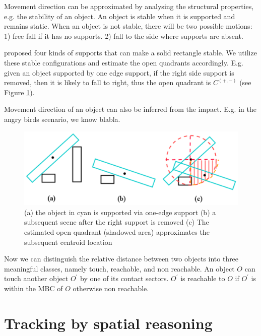\documentclass[letterpaper]{article}
\begin{document}
Movement direction can be approximated by analysing the structural properties, e.g. the stability of an object. An object is stable when it is supported and remains static. When an object is not stable, there will be two possible motions: 1) free fall if it has no supports. 2) fall to the side where supports are absent. 

\cite{Ge2013} proposed four kinds of supports that can make a solid rectangle stable. We utilize these stable configurations and estimate the open quadrants accordingly. E.g. given an object supported by one edge support, if the right side support is removed, then it is likely to fall to right, thus the open quadrant is $C^{(+,-)}$
(see Figure \ref{QudrantsEstimation}). 

Movement direction of an object can also be inferred from the impact. E.g. in the angry birds scenario, we know blabla.  

\begin{figure}[h!]\label{QudrantsEstimation}
\centering\includegraphics[scale=0.4]{QudrantsEstimation.png}\caption{(a) the object in cyan is supported via one-edge support  (b) a subsequent scene after the right support is removed (c) The estimated open quadrant (shadowed area) approximates the subsequent centroid location}
\end{figure}

Now we can distinguish the relative distance between two objects into three meaningful classes, namely touch, reachable, and non reachable. An object $O$ can touch another object $O^\prime$ by one of its contact sectors. $O^\prime$ is reachable to $O$ if $O^\prime$ is within the MBC of $O$ otherwise non reachable.



\section{Tracking by spatial reasoning}\label{trackingBySpatialReasoning}
\end{document}
